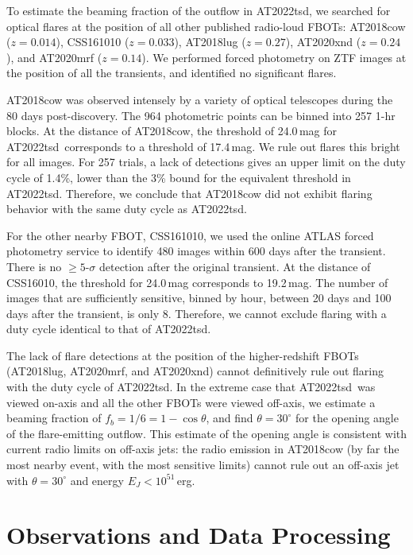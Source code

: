 \documentclass{nature_plusfigure}
\newcommand{\at}{AT2022tsd}
\begin{document}
\begin{methods}
To estimate the beaming fraction of the outflow in \at, we searched for optical flares at the position of all other published radio-loud FBOTs: AT2018cow\cite{Prentice2018} ($z=0.014$), CSS161010\cite{Coppejans2020} ($z=0.033$),
AT2018lug\cite{Ho2020_Koala} ($z=0.27$),
AT2020xnd\cite{Perley2021} ($z=0.24$), and
AT2020mrf\cite{Yao2022} ($z=0.14$).
We performed forced photometry on ZTF images at the position of all the transients, and identified no significant flares. 

AT2018cow was observed intensely by a variety of optical telescopes during the 80 days post-discovery\cite{Perley2019}. The 964 photometric points can be binned into 257 1-hr blocks. At the distance of AT2018cow, the threshold of 24.0\,mag for \at\ corresponds to a threshold of 17.4\,mag. We rule out flares this bright for all images. For 257 trials, a lack of detections gives an upper limit on the duty cycle of 1.4\%, lower than the 3\% bound for the equivalent threshold in \at. Therefore, we conclude that AT2018cow did not exhibit flaring behavior with the same duty cycle as \at.

For the other nearby FBOT, CSS161010, we used the online ATLAS\cite{Tonry2018,Smith2020} forced photometry service\cite{Shingles2021} to identify 480 images within 600 days after the transient. There is no $\geq5$-$\sigma$ detection after the original transient. At the distance of CSS16010, the threshold for 24.0\,mag corresponds to 19.2\,mag. The number of images that are sufficiently sensitive, binned by hour, between 20 days and 100 days after the transient, is only 8. Therefore, we cannot exclude flaring with a duty cycle identical to that of \at.

The lack of flare detections at the position of the higher-redshift FBOTs (AT2018lug, AT2020mrf, and AT2020xnd) cannot definitively rule out flaring with the duty cycle of \at. 
In the extreme case that \at\ was viewed on-axis and all the other FBOTs were viewed off-axis, we estimate a beaming fraction of $f_b = 1/6 = 1-\cos{\theta}$, and find $\theta=30^{\circ}$ for the opening angle of the flare-emitting outflow. This estimate of the opening angle is consistent with current radio limits on off-axis jets: the radio emission in AT2018cow (by far the most nearby event, with the most sensitive limits) cannot rule out an off-axis jet with $\theta=30^{\circ}$ and energy $E_J<10^{51}\,$erg\cite{Margutti2019}.

\section{Observations and Data Processing}


\end{methods}
\end{document}
